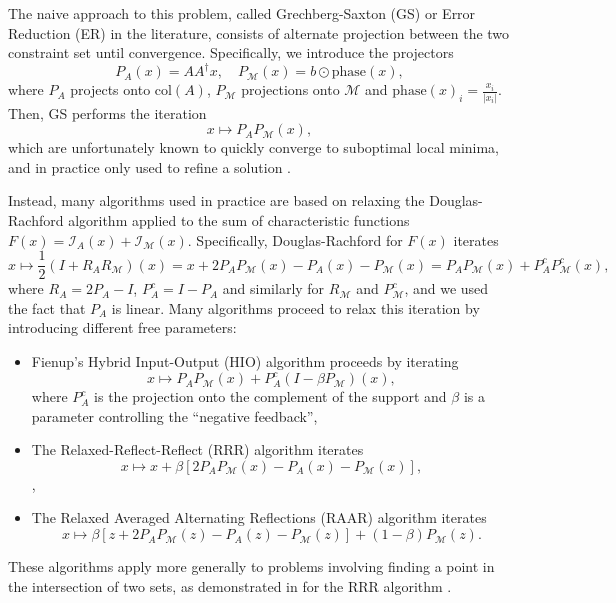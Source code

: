 \documentclass[journal]{IEEEtran}
\theoremstyle{definition}
\theoremstyle{remark}
\theoremstyle{definition}
\theoremstyle{problem}
\theoremstyle{definition}
\newcommand{\col}{\text{col}}
\newcommand{\phase}{\text{phase}}
\newcommand{\II}{\mathcal{I} }
\newcommand{\MM}{\mathcal{M}}
\newcommand{\TODO}[1]{{\color{red}{[#1]}}}
\begin{document}
The naive approach to this problem, called Grechberg-Saxton (GS) or Error Reduction (ER) in the literature, consists of alternate projection between the two constraint set until convergence. Specifically, we introduce the projectors 
\begin{equation}\label{eq:projections}
    P_A(x) = AA^{\dagger}x, \quad P_{\MM}(x)=b\odot \phase(x),
\end{equation}
where $P_A$ projects onto $\col(A)$, $P_{\MM}$ projections onto $\MM$ and $\phase(x)_i=\frac{x_i}{|x_i|}$. Then, GS performs the iteration 
\begin{equation}\label{eq:GS}
    x\mapsto P_AP_{\MM}(x),    
\end{equation}
which are unfortunately known to quickly converge to suboptimal local minima, and in practice only used to refine a solution \cite{Elser2017, Marchesini2007}. 

Instead, many algorithms used in practice are based on relaxing the Douglas-Rachford algorithm applied to the sum of characteristic functions $F(x) = \II_{A}(x)+\II_{\MM}(x)$. Specifically, Douglas-Rachford for $F(x)$ iterates \begin{equation}\label{eq:Doug_Rach}
    x\mapsto \frac{1}{2}(I+R_AR_{\MM})(x) = x + 2P_AP_{\MM}(x) - P_A(x) - P_{\MM}(x) = P_AP_{\MM}(x) + P_A^cP_{\MM}^c(x),
\end{equation} 
where $R_A = 2P_A-I$, $P_A^c=I-P_A$ and similarly for $R_{\MM}$ and $P_{\MM}^c$, and we used the fact that $P_A$ is linear. Many algorithms proceed to relax this iteration by introducing different free parameters\TODO{Rewrite in terms of reflections?}:

\begin{itemize}
    \item Fienup's Hybrid Input-Output (HIO) algorithm proceeds by iterating 
    \begin{equation}\label{eq:HIO}
        x\mapsto P_AP_{\MM}(x) + P_A^c(I-\beta P_{\MM})(x),
    \end{equation} 
    where $P_A^c$ is the projection onto the complement of the support and $\beta$ is a parameter controlling the ``negative feedback'',
    \item The Relaxed-Reflect-Reflect (RRR) algorithm iterates
    \begin{equation}\label{eq:RRR}
        x\mapsto x + \beta\left[2P_AP_{\MM}(x)-P_A(x)-P_{\MM}(x)\right],
    \end{equation},
    \item The Relaxed Averaged Alternating Reflections (RAAR) algorithm iterates
    \begin{equation}\label{eq:RAAR}
        x\mapsto \beta\left[z + 2P_AP_{\MM}(z)-P_A(z)-P_{\MM}(z)\right] + (1-\beta)P_{\MM}(z).
    \end{equation}
\end{itemize}
These algorithms apply more generally to problems involving finding a point in the intersection of two sets, as demonstrated in \TODO{Veit, PNAS} for the RRR algorithm \TODO{Actually, "difference map"}.
\end{document}
